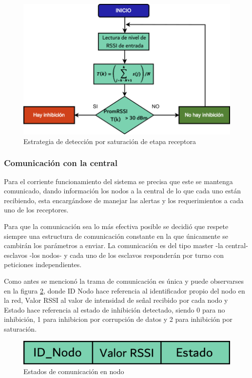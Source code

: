 \begin{figure}
	\centering
	\includegraphics[scale=0.43]{images/nodos/estrategia_rssi.png}
    \caption{Estrategia de detección por saturación de etapa receptora}
	\label{estrategia_rssi}
\end{figure}

\subsubsection{Comunicación con la central}

Para el corriente funcionamiento del sistema se precisa que este se mantenga comunicado, dando información los nodos a la 
central de lo que cada uno están recibiendo, esta encargándose de manejar las alertas y los requerimientos a cada uno de los 
receptores. \par 
Para que la comunicación sea lo más efectiva posible se decidió que respete siempre una estructura de comunicación constante
en la que únicamente se cambirán los parámetros a enviar. La comunicación es del tipo master -la central- esclavos -los nodos-
y cada uno de los esclavos responderán por turno con peticiones independientes. \par
Como antes se mencionó la trama de comunicación es única y puede observarses en la figura \ref{comunicacion_nodo}, donde 
ID Nodo hace referencia al identificador propio del nodo en la red, Valor RSSI al valor de intensidad de señal recibido por cada
nodo y Estado hace referencia al estado de inhibición detectado, siendo 0 para no inhibición, 1 para inhibicion por corrupción
de datos y 2 para inhibición por saturación.

\begin{figure}
	\centering
	\includegraphics[scale=0.43]{images/nodos/comunicacion_nodo.png}
    \caption{Estados de comunicación en nodo}
	\label{comunicacion_nodo}
\end{figure}

